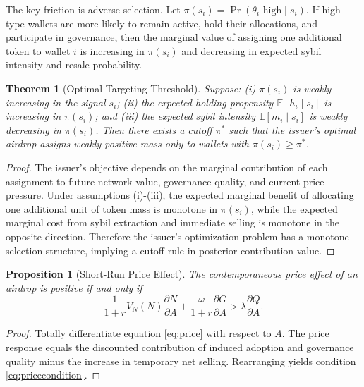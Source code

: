 \documentclass[11pt]{article}
\newtheorem{theorem}{Theorem}
\newtheorem{proposition}{Proposition}
\theoremstyle{remark}
\begin{document}
The key friction is adverse selection. Let $\pi(s_i)=\Pr(\theta_i \text{ high} \mid s_i)$. If high-type wallets are more likely to remain active, hold their allocations, and participate in governance, then the marginal value of assigning one additional token to wallet $i$ is increasing in $\pi(s_i)$ and decreasing in expected sybil intensity and resale probability.

\begin{theorem}[Optimal Targeting Threshold]
\label{thm:targeting}
Suppose: (i) $\pi(s_i)$ is weakly increasing in the signal $s_i$; (ii) the expected holding propensity $\mathbb{E}[h_i \mid s_i]$ is increasing in $\pi(s_i)$; and (iii) the expected sybil intensity $\mathbb{E}[m_i \mid s_i]$ is weakly decreasing in $\pi(s_i)$. Then there exists a cutoff $\pi^\ast$ such that the issuer's optimal airdrop assigns weakly positive mass only to wallets with $\pi(s_i) \ge \pi^\ast$.
\end{theorem}

\begin{proof}
The issuer's objective depends on the marginal contribution of each assignment to future network value, governance quality, and current price pressure. Under assumptions (i)-(iii), the expected marginal benefit of allocating one additional unit of token mass is monotone in $\pi(s_i)$, while the expected marginal cost from sybil extraction and immediate selling is monotone in the opposite direction. Therefore the issuer's optimization problem has a monotone selection structure, implying a cutoff rule in posterior contribution value.
\end{proof}

\begin{proposition}[Short-Run Price Effect]
\label{prop:priceeffect}
The contemporaneous price effect of an airdrop is positive if and only if
\begin{equation}
\frac{1}{1+r}V_N(N)\frac{\partial N}{\partial A}
 + \frac{\omega}{1+r}\frac{\partial G}{\partial A}
>
\lambda \frac{\partial Q}{\partial A}.
\label{eq:pricecondition}
\end{equation}
\end{proposition}

\begin{proof}
Totally differentiate equation \eqref{eq:price} with respect to $A$. The price response equals the discounted contribution of induced adoption and governance quality minus the increase in temporary net selling. Rearranging yields condition \eqref{eq:pricecondition}.
\end{proof}
\end{document}
